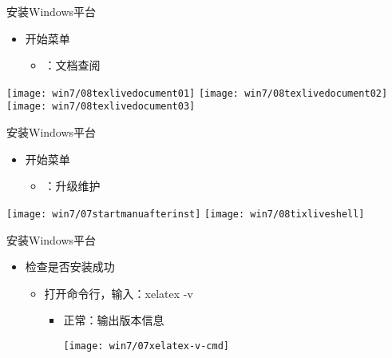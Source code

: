 \documentclass[fontset = none, t]{ctexbeamer}
\begin{document}
\begin{frame}{安装\tl}{Windows平台}
  \begin{spacing}{1.2}
    \begin{itemize}
    \item \keys{\tl}开始菜单
      \begin{itemize}
      \item {}：文档查阅
      \end{itemize}
    \end{itemize}  
    \begin{center}
      \texttt{[image: win7/08texlivedocument01]}
      \texttt{[image: win7/08texlivedocument02]}\\
      \texttt{[image: win7/08texlivedocument03]}
    \end{center}
  \end{spacing}
\end{frame}

\begin{frame}{安装\tl}{Windows平台}
  \begin{spacing}{1.5}
    \begin{itemize}
    \item \keys{\tl}开始菜单
      \begin{itemize}
      \item {}：升级维护
      \end{itemize}
    \end{itemize}  
    \begin{center}
      \texttt{[image: win7/07startmanuafterinst]}
      \texttt{[image: win7/08tixliveshell]}
    \end{center}
  \end{spacing}
\end{frame}

\begin{frame}{安装\tl}{Windows平台}
  \begin{spacing}{1.5}
    \begin{itemize}
    \item 检查\tl 是否安装成功
      \begin{itemize}
      \item 打开命令行，输入：xelatex -v
        \begin{itemize}
        \item 正常：输出\alert{版本}信息
          \begin{center}
            \texttt{[image: win7/07xelatex-v-cmd]}
          \end{center}
        \end{itemize}
      \end{itemize}
    \end{itemize}
  \end{spacing}         
\end{frame}
\end{document}
